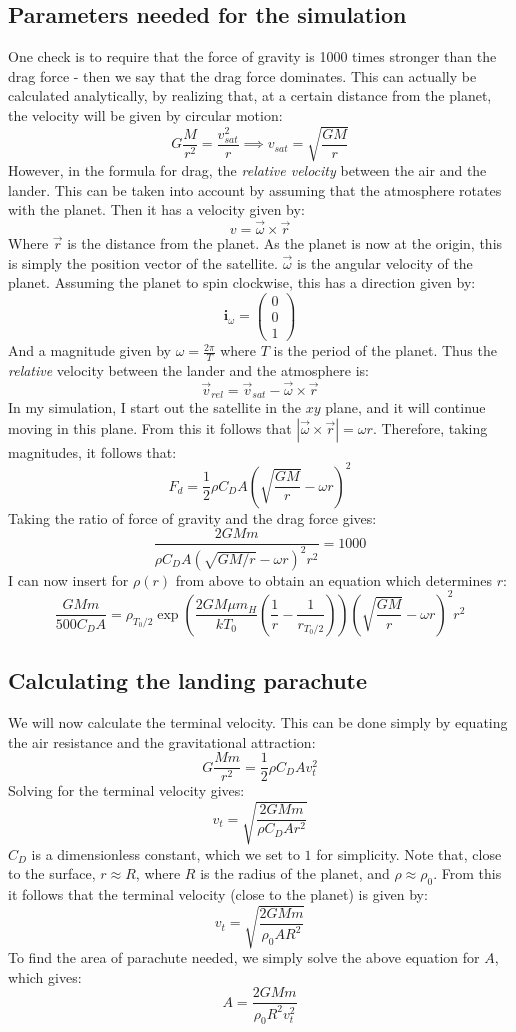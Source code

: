 \documentclass[a4paper,10pt,english]{article}
\begin{document}
\subsection{Parameters needed for the simulation}
One check is to require that the force of gravity is 1000 times stronger than the drag force - then we say that the drag force dominates. This can actually be calculated analytically, by realizing that, at a certain distance from the planet, the velocity will be given by circular motion:
$$G\frac{M}{r^2}=\frac{v_{sat}^2}{r}\implies v_{sat}=\sqrt{\frac{GM}{r}}$$
However, in the formula for drag, the \textit{relative velocity} between the air and the lander. This can be taken into account by assuming that the atmosphere rotates with the planet. Then it has a velocity given by:
$$v=\vec{\omega} \times \vec{r}$$
Where $\vec{r}$ is the distance from the planet. As the planet is now at the origin, this is simply the position vector of the satellite. $\vec{\omega}$ is the angular velocity of the planet. Assuming the planet to spin clockwise, this has a direction given by:
$$\mathbf{i}_{\omega}=\begin{pmatrix}
0\\
0\\
1
\end{pmatrix}$$
And a magnitude given by $\omega=\frac{2\pi}{T}$ where $T$ is the period of the planet. Thus the \textit{relative} velocity between the lander and the atmosphere is:
$$\vec{v}_{rel}=\vec{v}_{sat}-\vec{\omega}\times \vec{r}$$
In my simulation, I start out the satellite in the $xy$ plane, and it will continue moving in this plane. From this it follows that $\left|\vec{\omega} \times \vec{r}\right|=\omega r$.
Therefore, taking magnitudes, it follows that:
$$F_d=\frac{1}{2}\rho C_DA\left(\sqrt{\frac{GM}{r}}-\omega r\right)^2$$
Taking the ratio of force of gravity and the drag force gives:
$$\frac{2GMm}{\rho C_D A(\sqrt{GM/r}-\omega r)^2r^2}=1000$$
I can now insert for $\rho(r)$ from above to obtain an equation which determines $r$:
$$\frac{GMm}{500C_D A}=\rho_{T_0/2}\exp\left(\frac{2GM\mu m_H}{kT_0}\left(\frac{1}{r}-\frac{1}{r_{T_0/2}}\right)\right)\left(\sqrt{\frac{GM}{r}}-\omega r\right)^2r^2$$

\subsection{Calculating the landing parachute}
We will now calculate the terminal velocity. This can be done simply by equating the air resistance and the gravitational attraction:
$$G\frac{Mm}{r^2}=\frac{1}{2}\rho C_D A v_t^2$$
Solving for the terminal velocity gives:
$$v_t=\sqrt{\frac{2GMm}{\rho C_D Ar^2}}$$
$C_D$ is a dimensionless constant, which we set to $1$ for simplicity. Note that, close to the surface, $r \approx R$, where $R$ is the radius of the planet, and $\rho \approx \rho_0$. From this it follows that the terminal velocity (close to the planet) is given by:
$$v_t=\sqrt{\frac{2GMm}{\rho_0 AR^2}}$$
To find the area of parachute needed, we simply solve the above equation for $A$, which gives:
$$A=\frac{2GMm}{\rho_0R^2v_t^2}$$
\end{document}
